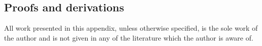 \documentclass{report}
\begin{document}



\begin{appendix}
\chapter{Proofs and derivations}
All work presented in this appendix, unless otherwise specified, is the sole work
of the author and is not given in any of the literature which the author is aware of.



\end{appendix}

\end{document}
